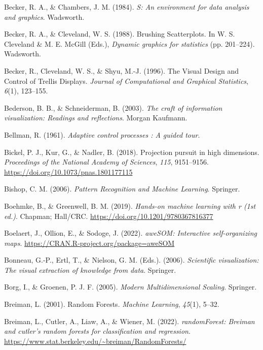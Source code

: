 \documentclass[
  letterpaper,
]{krantz}
\newlength{\cslhangindent}
\newenvironment{CSLReferences}[2] %
 {\begin{list}{}{%
  \setlength{\itemindent}{0pt}
  \setlength{\leftmargin}{0pt}
  \setlength{\parsep}{0pt}
  \ifodd #1
   \setlength{\leftmargin}{\cslhangindent}
   \setlength{\itemindent}{-1\cslhangindent}
  \fi
  \setlength{\itemsep}{#2\baselineskip}}}
 {\end{list}}
\begin{document}
\begin{CSLReferences}{1}{0}
Becker, R. A., \& Chambers, J. M. (1984). \emph{{S}: An environment for
data analysis and graphics}. Wadsworth.

Becker, R. A., \& Cleveland, W. S. (1988). {B}rushing {S}catterplots. In
W. S. Cleveland \& M. E. McGill (Eds.), \emph{Dynamic graphics for
statistics} (pp. 201--224). Wadsworth.

Becker, R., Cleveland, W. S., \& Shyu, M.-J. (1996). {T}he {V}isual
{D}esign and {C}ontrol of {T}rellis {D}isplays. \emph{Journal of
Computational and Graphical Statistics}, \emph{6}(1), 123--155.

Bederson, B. B., \& Schneiderman, B. (2003). \emph{The craft of
information visualization: Readings and reflections}. Morgan Kaufmann.

Bellman, R. (1961). \emph{Adaptive control processes : A guided tour}.

Bickel, P. J., Kur, G., \& Nadler, B. (2018). Projection pursuit in high
dimensions. \emph{Proceedings of the National Academy of Sciences},
\emph{115}, 9151--9156. \url{https://doi.org/10.1073/pnas.1801177115}

Bishop, C. M. (2006). \emph{Pattern {R}ecognition and {M}achine
{L}earning}. Springer.

Boehmke, B., \& Greenwell, B. M. (2019). \emph{Hands-on machine learning
with r (1st ed.)}. Chapman; Hall/CRC.
\url{https://doi.org/10.1201/9780367816377}

Boelaert, J., Ollion, E., \& Sodoge, J. (2022). \emph{aweSOM:
Interactive self-organizing maps}.
\url{https://CRAN.R-project.org/package=aweSOM}

Bonneau, G.-P., Ertl, T., \& Nielson, G. M. (Eds.). (2006).
\emph{Scientific visualization: The visual extraction of knowledge from
data}. Springer.

Borg, I., \& Groenen, P. J. F. (2005). \emph{Modern {M}ultidimensional
{S}caling}. Springer.

Breiman, L. (2001). Random {F}orests. \emph{Machine Learning},
\emph{45}(1), 5--32.

Breiman, L., Cutler, A., Liaw, A., \& Wiener, M. (2022).
\emph{randomForest: Breiman and cutler's random forests for
classification and regression}.
\url{https://www.stat.berkeley.edu/~breiman/RandomForests/}


\end{CSLReferences}
\end{document}
